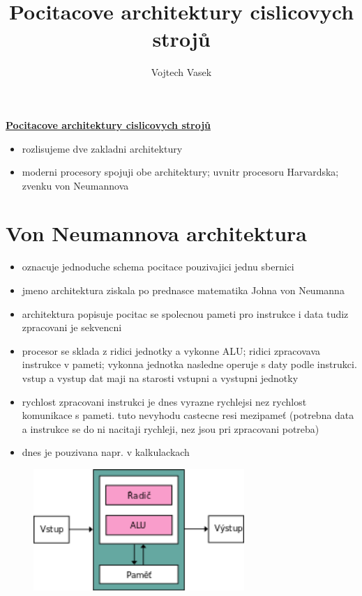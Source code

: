 \documentclass[a4paper,12pt]{article}
\title{Pocitacove architektury cislicovych strojů}
\author{Vojtech Vasek}
\begin{document}
\begin{center}
    \huge{\underline{\textbf{Pocitacove architektury cislicovych strojů}}}
\end{center}
\begin{itemize}
    \item{rozlisujeme dve zakladni architektury}
    \item{moderni procesory spojuji obe architektury; uvnitr procesoru Harvardska; zvenku von Neumannova}
\end{itemize}

\section{Von Neumannova architektura}
    \begin{itemize}
        \item{oznacuje jednoduche schema pocitace pouzivajici jednu sbernici}
        \item{jmeno architektura ziskala po prednasce matematika Johna von Neumanna}
        \item{architektura popisuje pocitac se spolecnou pameti pro instrukce i data tudiz zpracovani je sekvencni}
        \item{procesor se sklada z ridici jednotky a vykonne ALU; ridici zpracovava instrukce v pameti; vykonna jednotka nasledne operuje s daty podle instrukci. vstup a vystup dat maji na starosti vstupni a vystupni jednotky}
        \item{rychlost zpracovani instrukci je dnes vyrazne rychlejsi nez rychlost komunikace s pameti. tuto nevyhodu castecne resi mezipameť (potrebna data a instrukce se do ni nacitaji rychleji, nez jsou pri zpracovani potreba)}
        \item{dnes je pouzivana napr. v kalkulackach}
    \end{itemize}
    \begin{figure}[htp]
        \centering
        \includegraphics[width=8cm]{TVP_1_10_23@3.png}
    \end{figure}
\end{document}
